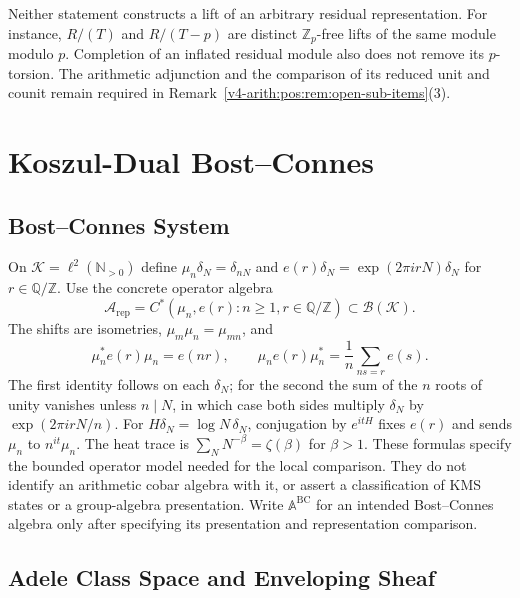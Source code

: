 Neither statement constructs a lift of an arbitrary residual
representation. For instance, \(R/(T)\) and \(R/(T-p)\)
are distinct \(\mathbb Z_p\)-free lifts of the same module
modulo \(p\). Completion of an inflated residual module also
does not remove its \(p\)-torsion.
The arithmetic adjunction and the comparison of its reduced
unit and counit remain required in
Remark~\ref{v4-arith:pos:rem:open-sub-items}(3).

\section{Koszul-Dual Bost--Connes}
\label{v4-arith:w5-d:sec:koszul-dual-BC}

\subsection{Bost--Connes System}
\label{v4-arith:w5-d:bc-koszul:BC-system}

On \(\mathcal K=\ell^2(\mathbb N_{>0})\) define
\(\mu_n\delta_N=\delta_{nN}\) and
\(e(r)\delta_N=\exp(2\pi i rN)\delta_N\) for \(r\in\mathbb Q/\mathbb Z\).
Use the concrete operator algebra
\begin{equation}
\label{v4-arith:w5-d:eq:BC-def}
 \mathcal A_{\mathrm{rep}}=C^*(\mu_n,e(r):n\ge1,r\in\mathbb Q/\mathbb Z)
 \subset\mathcal B(\mathcal K).
\end{equation}
The shifts are isometries, \(\mu_m\mu_n=\mu_{mn}\), and
\[
 \mu_n^*e(r)\mu_n=e(nr),\qquad
 \mu_ne(r)\mu_n^*=\frac1n\sum_{ns=r}e(s).
\]
The first identity follows on each \(\delta_N\); for the second the
sum of the \(n\) roots of unity vanishes unless \(n\mid N\), in
which case both sides multiply \(\delta_N\) by
\(\exp(2\pi i rN/n)\).
For \(H\delta_N=\log N\,\delta_N\), conjugation by \(e^{itH}\)
fixes \(e(r)\) and sends \(\mu_n\) to \(n^{it}\mu_n\).
The heat trace is \(\sum_NN^{-\beta}=\zeta(\beta)\) for \(\beta>1\).
These formulas specify the bounded operator model needed for the local
comparison. They do not identify an arithmetic cobar algebra with it,
or assert a classification of KMS states or a group-algebra presentation.
Write \(\mathbb A^{\mathrm{BC}}\) for an intended Bost--Connes algebra
only after specifying its presentation and representation comparison.

\subsection{Adele Class Space and Enveloping Sheaf}
\label{v4-arith:w5-d:bc-koszul:adele-class}

